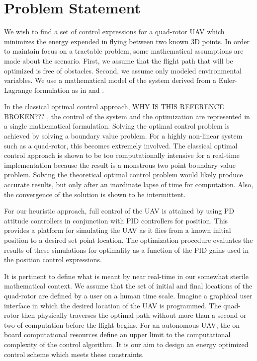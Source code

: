 
\chapter{Problem Statement} %

\label{Chapter2} %




We wish to find a set of control expressions for a quad-rotor UAV which minimizes the energy expended in flying between two known 3D points. In order to maintain focus on a tractable problem, some mathematical assumptions are made about the scenario. First, we assume that the flight path that will be optimized is free of obstacles. Second, we assume only modeled environmental variables. We use a mathematical model of the system derived from a Euler-Lagrange formulation as in \cite{Luukkonen} and \cite{bouabdallah2004pid}. 

In the classical optimal control approach,\cite{BrysonHo69} \cite{kirk70} {\color{red}WHY IS THIS REFERENCE BROKEN???} \cite{lewis2012optimal}, the control of the system and the optimization are represented in a single mathematical formulation. Solving the optimal control problem is achieved by solving a boundary value problem. For a highly non-linear system such as a quad-rotor, this becomes extremely involved. The classical optimal control approach is shown to be too computationally intensive for a real-time implementation because the result is a monstrous two point boundary value problem. Solving the theoretical optimal control problem would likely produce accurate results, but only after an inordinate lapse of time for computation. Also, the convergence of the solution is shown to be intermittent. 

 For our heuristic approach, full control of the UAV is attained by using PD attitude controllers in conjunction with PID controllers for position. This provides a platform for simulating the UAV as it flies from a known initial position to a desired set point location. The optimization procedure evaluates the results of these simulations for optimality as a function of the PID gains used in the position control expressions.   

It is pertinent to define what is meant by near real-time in our somewhat sterile mathematical context. We assume that the set of initial and final locations of the quad-rotor are defined by a user on a human time scale. Imagine a graphical user interface in which the desired location of the UAV is programmed. The quad-rotor then physically traverses the optimal path without more than a second or two of computation before the flight begins. For an autonomous UAV, the on board computational resources define an upper limit to the computational complexity of the control algorithm. It is our aim to design an energy optimized control scheme which meets these constraints. 

